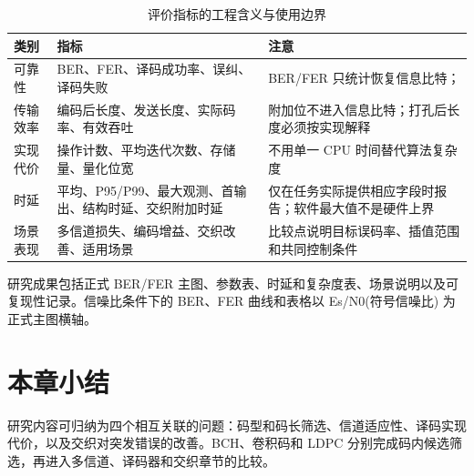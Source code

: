 \begin{table}[htbp]
  \centering
  \small
  \caption{评价指标的工程含义与使用边界}
  \label{tab:metric-categories}
  \begin{tabular}{p{}p{}p{}}
    \toprule
    类别 & 指标 & 注意 \\
    \midrule
    可靠性 & BER、FER、译码成功率、误纠、译码失败 & BER/FER 只统计恢复信息比特；\\
    传输效率 & 编码后长度、发送长度、实际码率、有效吞吐 & 附加位不进入信息比特；打孔后长度必须按实现解释 \\
    实现代价 & 操作计数、平均迭代次数、存储量、量化位宽 & 不用单一 CPU 时间替代算法复杂度 \\
    时延 & 平均、P95/P99、最大观测、首输出、结构时延、交织附加时延 & 仅在任务实际提供相应字段时报告；软件最大值不是硬件上界 \\
    场景表现 & 多信道损失、编码增益、交织改善、适用场景 & 比较点说明目标误码率、插值范围和共同控制条件 \\
    \bottomrule
  \end{tabular}
\end{table}

研究成果包括正式 BER/FER 主图、参数表、时延和复杂度表、场景说明以及可复现性记录。信噪比条件下的 BER、FER 曲线和表格以 Es/N0(符号信噪比) 为正式主图横轴。

\section{本章小结}

研究内容可归纳为四个相互关联的问题：码型和码长筛选、信道适应性、译码实现代价，以及交织对突发错误的改善。BCH、卷积码和 LDPC 分别完成码内候选筛选，再进入多信道、译码器和交织章节的比较。
